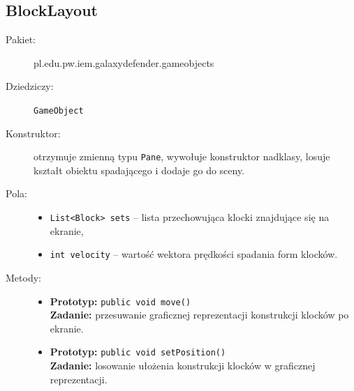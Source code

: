 \documentclass[a4paper]{article}
\newcommand{\prog}{\texttt}
\begin{document}
\subsection{BlockLayout}
\begin{description}
    \item[Pakiet:] pl.edu.pw.iem.galaxydefender.gameobjects
    \item[Dziedziczy:] \prog{GameObject}
    \item[Konstruktor:] otrzymuje zmienną typu \prog{Pane}, wywołuje konstruktor nadklasy, losuje kształt obiektu spadającego i dodaje go do sceny.
    \item[Pola:] \hfill
    \begin{itemize}
        \item \prog{List<Block> sets} -- lista przechowująca klocki znajdujące się na ekranie,
        \item \prog{int velocity} -- wartość wektora prędkości spadania form klocków.
    \end{itemize}
    \item[Metody:] \hfill
    \begin{itemize}
        \item \textbf{Prototyp:} \prog{public void move()}\\\textbf{Zadanie:} przesuwanie graficznej reprezentacji konstrukcji klocków po ekranie.
        \item \textbf{Prototyp:} \prog{public void setPosition()}\\\textbf{Zadanie:} losowanie ułożenia konstrukcji klocków w graficznej reprezentacji.
    \end{itemize} 
\end{description}
\end{document}
